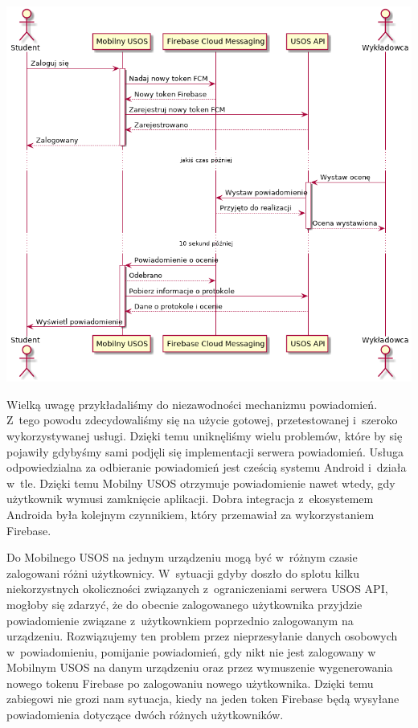 \documentclass{pracamgr}
\begin{document}
\begingroup
\centering
\includegraphics[width=\linewidth]{img/firebase.png}
\label{fig:firebase}
\medskip
\endgroup

Wielką uwagę przykładaliśmy do niezawodności mechanizmu powiadomień. Z~tego powodu
zdecydowaliśmy się na użycie gotowej, przetestowanej i~szeroko wykorzystywanej
usługi. Dzięki temu uniknęliśmy wielu problemów, które by się pojawiły gdybyśmy
sami podjęli się implementacji serwera powiadomień. Usługa odpowiedzialna za
odbieranie powiadomień jest cześcią systemu Android i~działa w~tle. Dzięki temu
Mobilny USOS otrzymuje powiadomienie nawet wtedy, gdy użytkownik wymusi zamknięcie
aplikacji. Dobra integracja z~ekosystemem Androida była kolejnym czynnikiem, który
przemawiał za wykorzystaniem Firebase.

Do Mobilnego USOS na jednym urządzeniu mogą być w~różnym czasie zalogowani różni
użytkownicy. W~sytuacji gdyby doszło do splotu kilku niekorzystnych okoliczności
związanych z~ograniczeniami serwera USOS API, mogłoby się zdarzyć, że do obecnie
zalogowanego użytkownika przyjdzie powiadomienie związane z~użytkownkiem poprzednio zalogowanym
na urządzeniu. Rozwiązujemy ten problem przez nieprzesyłanie danych
osobowych w~powiadomieniu, pomijanie powiadomień, gdy nikt nie jest zalogowany w
Mobilnym USOS na danym urządzeniu oraz przez wymuszenie wygenerowania nowego tokenu
Firebase po zalogowaniu nowego użytkownika. Dzięki temu zabiegowi nie grozi nam
sytuacja, kiedy na jeden token Firebase będą wysyłane powiadomienia dotyczące dwóch
różnych użytkowników.
\end{document}
